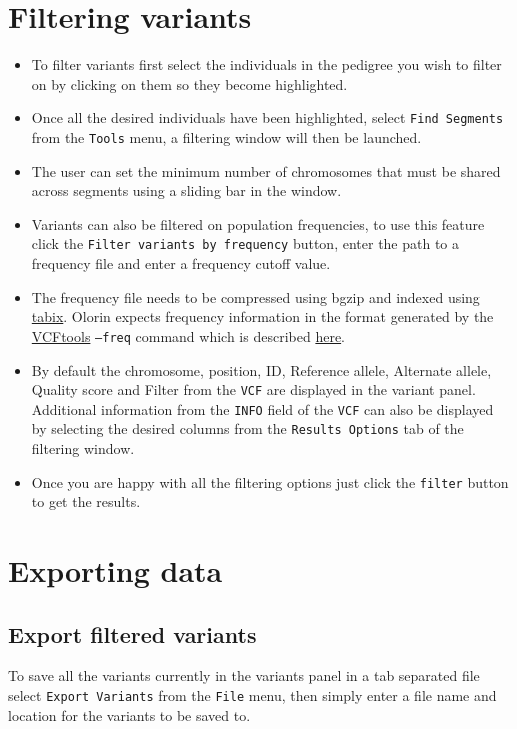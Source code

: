 \documentclass{article}
\begin{document}
\section{Filtering variants}
\begin{itemize}
	\item{To filter variants first select the individuals in the pedigree you wish to filter on by clicking on them so they become highlighted.}
	\item{Once all the desired individuals have been highlighted, select \texttt{Find Segments} from the \texttt{Tools} menu, a filtering window will then be launched. }
	\item{The user can set the minimum number of chromosomes that must be shared across segments using a sliding bar in the window.}
	\item{Variants can also be filtered on population frequencies, to use this feature click the \texttt{Filter variants by frequency} button, enter the path to a frequency file and enter a frequency cutoff value.}
	\item{The frequency file needs to be compressed using bgzip and indexed using \href{http://samtools.sourceforge.net/tabix.shtml}{tabix}. Olorin expects frequency information in the format generated by the \href{http://vcftools.sourceforge.net/}{VCFtools} \texttt{--freq} command which is described \href{http://vcftools.sourceforge.net/options.html#stats}{here}.}
	\item{By default the chromosome, position, ID, Reference allele, Alternate allele, Quality score and Filter from the \texttt{VCF} are displayed in the variant panel. Additional information from the \texttt{INFO} field of the \texttt{VCF} can also be displayed by selecting the desired columns from the \texttt{Results Options} tab of the filtering window.}
	\item{Once you are happy with all the filtering options just click the \texttt{filter} button to get the results.}
\end{itemize}

\section{Exporting data}

\subsection{Export filtered variants}
To save all the variants currently in the variants panel in a tab separated file select \texttt{Export Variants} from the \texttt{File} menu, then simply enter a file name and location for the variants to be saved to.
\end{document}
